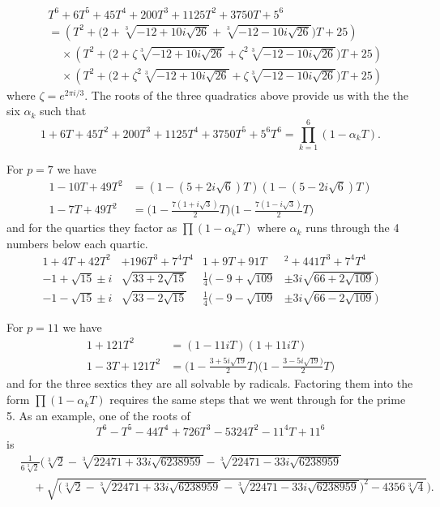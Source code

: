 \documentclass[10pt,oneside,reqno]{amsart}
\begin{document}
\begin{flushleft}
		\begin{align*}
			& T^6+6T^5+45T^4+200T^3+1125T^2+3750T+5^6 \\
			& =(T^2+\Bigg(2+\sqrt[3]{-12+10i\sqrt{26}}+\sqrt[3]{-12-10i\sqrt{26}}\Bigg)T+25) \\
			& \;\;\;\;\times(T^2+\Bigg(2+\zeta\sqrt[3]{-12+10i\sqrt{26}}+\zeta^2\sqrt[3]{-12-10i\sqrt{26}}\Bigg)T+25) \\
			& \;\;\;\;\times(T^2+\Bigg(2+\zeta^2\sqrt[3]{-12+10i\sqrt{26}}+\zeta\sqrt[3]{-12-10i\sqrt{26}}\Bigg)T+25)
		\end{align*}
		where $\zeta=e^{2\pi i/3}$.  The roots of the three quadratics above provide us with the the six $\alpha_k$ such that
		\begin{equation*}
			1+6T+45T^2+200T^3+1125T^4+3750T^5+5^6T^6=\prod_{k=1}^{6}(1-\alpha_kT).
		\end{equation*}
		
		\vspace{3mm}
		
		For $p=7$ we have
		\begin{align*}
			1-10T+49T^2 & = (1-(5+2i\sqrt{6})T)(1-(5-2i\sqrt{6})T) \\
			1-7T+49T^2 & =\Bigg(1-\frac{7(1+i\sqrt{3})}{2}T\Bigg)\Bigg(1-\frac{7(1-i\sqrt{3})}{2}T\Bigg)
		\end{align*}
		and for the quartics they factor as $\prod(1-\alpha_kT)$ where $\alpha_k$ runs through the 4 numbers below each quartic.
		\begin{align*}
			1+4T+42T^2&+196T^3+7^4T^4 & 1+9T+91T&^2+441T^3+7^4T^4 \\
			-1+\sqrt{15}\pm i&\sqrt{33+2\sqrt{15}} & \frac{1}{4}\Bigg(-9+\sqrt{109}&\pm 3i\sqrt{66+2\sqrt{109}}\Bigg) \\
			-1-\sqrt{15}\pm i&\sqrt{33-2\sqrt{15}} & \frac{1}{4}\Bigg(-9-\sqrt{109}&\pm 3i\sqrt{66-2\sqrt{109}}\Bigg)
		\end{align*}
		
		\vspace{3mm}
		
		For $p=11$ we have
		\begin{align*}
			1+121T^2 & = (1-11iT)(1+11iT) \\
			1-3T+121T^2 & =\Bigg(1-\frac{3+5i\sqrt{19}}{2}T\Bigg)\Bigg(1-\frac{3-5i\sqrt{19})}{2}T\Bigg)
		\end{align*}
		and for the three sextics they are all solvable by radicals.  Factoring them into the form $\prod(1-\alpha_kT)$ requires the same steps that we went through for the prime 5.  As an example, one of the roots of
		\begin{equation*}
			T^6-T^5-44T^4+726T^3-5324T^2-11^4T+11^6
		\end{equation*}
		is
		\begin{align*}
			& \frac{1}{6\sqrt[3]{2}}\Bigg(\sqrt[3]{2}-\sqrt[3]{22471+33i\sqrt{6238959}}-\sqrt[3]{22471-33i\sqrt{6238959}} \\
			& \;\;\;\;+\sqrt{\Bigg(\sqrt[3]{2}-\sqrt[3]{22471+33i\sqrt{6238959}}-\sqrt[3]{22471-33i\sqrt{6238959}}\Bigg)^2-4356\sqrt[3]{4}}\Bigg).
		\end{align*}
		

\end{flushleft}
\end{document}
